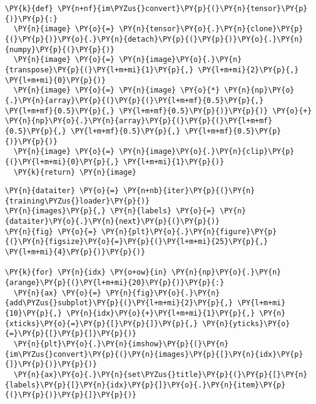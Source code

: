     \begin{tcolorbox}[breakable, size=fbox, boxrule=1pt, pad at break*=1mm,colback=cellbackground, colframe=cellborder]
\begin{Verbatim}[commandchars=\\\{\}]
\PY{k}{def} \PY{n+nf}{im\PYZus{}convert}\PY{p}{(}\PY{n}{tensor}\PY{p}{)}\PY{p}{:}
  \PY{n}{image} \PY{o}{=} \PY{n}{tensor}\PY{o}{.}\PY{n}{clone}\PY{p}{(}\PY{p}{)}\PY{o}{.}\PY{n}{detach}\PY{p}{(}\PY{p}{)}\PY{o}{.}\PY{n}{numpy}\PY{p}{(}\PY{p}{)}
  \PY{n}{image} \PY{o}{=} \PY{n}{image}\PY{o}{.}\PY{n}{transpose}\PY{p}{(}\PY{l+m+mi}{1}\PY{p}{,} \PY{l+m+mi}{2}\PY{p}{,} \PY{l+m+mi}{0}\PY{p}{)}
  \PY{n}{image} \PY{o}{=} \PY{n}{image} \PY{o}{*} \PY{n}{np}\PY{o}{.}\PY{n}{array}\PY{p}{(}\PY{p}{(}\PY{l+m+mf}{0.5}\PY{p}{,} \PY{l+m+mf}{0.5}\PY{p}{,} \PY{l+m+mf}{0.5}\PY{p}{)}\PY{p}{)} \PY{o}{+} \PY{n}{np}\PY{o}{.}\PY{n}{array}\PY{p}{(}\PY{p}{(}\PY{l+m+mf}{0.5}\PY{p}{,} \PY{l+m+mf}{0.5}\PY{p}{,} \PY{l+m+mf}{0.5}\PY{p}{)}\PY{p}{)}
  \PY{n}{image} \PY{o}{=} \PY{n}{image}\PY{o}{.}\PY{n}{clip}\PY{p}{(}\PY{l+m+mi}{0}\PY{p}{,} \PY{l+m+mi}{1}\PY{p}{)}
  \PY{k}{return} \PY{n}{image}
\end{Verbatim}
\end{tcolorbox}

    \begin{tcolorbox}[breakable, size=fbox, boxrule=1pt, pad at break*=1mm,colback=cellbackground, colframe=cellborder]
\begin{Verbatim}[commandchars=\\\{\}]
\PY{n}{dataiter} \PY{o}{=} \PY{n+nb}{iter}\PY{p}{(}\PY{n}{training\PYZus{}loader}\PY{p}{)}
\PY{n}{images}\PY{p}{,} \PY{n}{labels} \PY{o}{=} \PY{n}{dataiter}\PY{o}{.}\PY{n}{next}\PY{p}{(}\PY{p}{)}
\PY{n}{fig} \PY{o}{=} \PY{n}{plt}\PY{o}{.}\PY{n}{figure}\PY{p}{(}\PY{n}{figsize}\PY{o}{=}\PY{p}{(}\PY{l+m+mi}{25}\PY{p}{,} \PY{l+m+mi}{4}\PY{p}{)}\PY{p}{)}

\PY{k}{for} \PY{n}{idx} \PY{o+ow}{in} \PY{n}{np}\PY{o}{.}\PY{n}{arange}\PY{p}{(}\PY{l+m+mi}{20}\PY{p}{)}\PY{p}{:}
  \PY{n}{ax} \PY{o}{=} \PY{n}{fig}\PY{o}{.}\PY{n}{add\PYZus{}subplot}\PY{p}{(}\PY{l+m+mi}{2}\PY{p}{,} \PY{l+m+mi}{10}\PY{p}{,} \PY{n}{idx}\PY{o}{+}\PY{l+m+mi}{1}\PY{p}{,} \PY{n}{xticks}\PY{o}{=}\PY{p}{[}\PY{p}{]}\PY{p}{,} \PY{n}{yticks}\PY{o}{=}\PY{p}{[}\PY{p}{]}\PY{p}{)}
  \PY{n}{plt}\PY{o}{.}\PY{n}{imshow}\PY{p}{(}\PY{n}{im\PYZus{}convert}\PY{p}{(}\PY{n}{images}\PY{p}{[}\PY{n}{idx}\PY{p}{]}\PY{p}{)}\PY{p}{)}
  \PY{n}{ax}\PY{o}{.}\PY{n}{set\PYZus{}title}\PY{p}{(}\PY{p}{[}\PY{n}{labels}\PY{p}{[}\PY{n}{idx}\PY{p}{]}\PY{o}{.}\PY{n}{item}\PY{p}{(}\PY{p}{)}\PY{p}{]}\PY{p}{)}
  
\end{Verbatim}
\end{tcolorbox}

